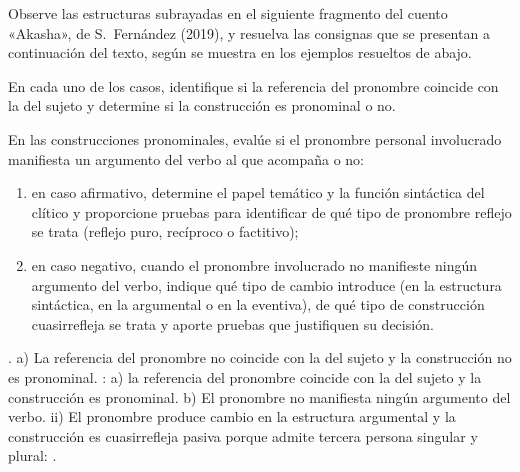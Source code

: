\begin{ejercicio}\label{ej:10-akasha}
Observe las estructuras subrayadas en el siguiente fragmento del cuento
«Akasha», de S.~Fernández (2019), y resuelva las consignas que se presentan a
continuación del texto, según se muestra en los ejemplos resueltos de abajo.


\begin{consignas}
  \item En cada uno de los casos, identifique si la referencia del pronombre
        coincide con la del sujeto y determine si la construcción es pronominal
        o no.
  \item En las construcciones pronominales, evalúe si el pronombre personal
        involucrado manifiesta un argumento del verbo al que acompaña o no:
        \begin{enumerate}[label=\roman*)]
          \item en caso afirmativo, determine el papel temático y la función
                sintáctica del clítico y proporcione pruebas para identificar de
                qué tipo de pronombre reflejo se trata (reflejo puro, recíproco
                o factitivo);
          \item en caso negativo, cuando el pronombre involucrado no manifieste
                ningún argumento del verbo, indique qué tipo de cambio introduce
                (en la estructura sintáctica, en la argumental o en la
                eventiva), de qué tipo de construcción cuasirrefleja se trata y
                aporte pruebas que justifiquen su decisión.
        \end{enumerate}
\end{consignas}

\begin{resuelto}
. a) La referencia del pronombre no coincide con la
del sujeto y la construcción no es pronominal. : a) la referencia del pronombre
coincide con la del sujeto y la construcción es pronominal. b) El pronombre no
manifiesta ningún argumento del verbo. ii) El pronombre produce cambio en la
estructura argumental y la construcción es cuasirrefleja pasiva porque admite
tercera persona singular y plural: .
\end{resuelto}
\end{ejercicio}

